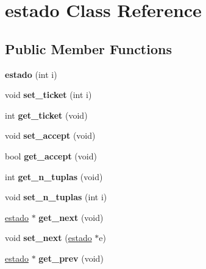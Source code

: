 \hypertarget{classestado}{}\section{estado Class Reference}
\label{classestado}
\subsection*{Public Member Functions}
\begin{DoxyCompactItemize}
\item 
\hypertarget{classestado_a3a5443ccc029390f191d4a1d7294bb8c}{}\label{classestado_a3a5443ccc029390f191d4a1d7294bb8c} 
{\bfseries estado} (int i)
\item 
\hypertarget{classestado_af4b08129baba3c527c2c312b63767b52}{}\label{classestado_af4b08129baba3c527c2c312b63767b52} 
void {\bfseries set\+\_\+ticket} (int i)
\item 
\hypertarget{classestado_a738263997aa35831fd0f5d090688185a}{}\label{classestado_a738263997aa35831fd0f5d090688185a} 
int {\bfseries get\+\_\+ticket} (void)
\item 
\hypertarget{classestado_a97b20af73c289adf4d88bd6ff5f2d875}{}\label{classestado_a97b20af73c289adf4d88bd6ff5f2d875} 
void {\bfseries set\+\_\+accept} (void)
\item 
\hypertarget{classestado_a35f0504728503b9c8d5c76f46d03a1b4}{}\label{classestado_a35f0504728503b9c8d5c76f46d03a1b4} 
bool {\bfseries get\+\_\+accept} (void)
\item 
\hypertarget{classestado_a5c0d978fb042c0501e6d94ec5dfcfa13}{}\label{classestado_a5c0d978fb042c0501e6d94ec5dfcfa13} 
int {\bfseries get\+\_\+n\+\_\+tuplas} (void)
\item 
\hypertarget{classestado_aef1cab9cf3fc54b1e6f94079eb763ffb}{}\label{classestado_aef1cab9cf3fc54b1e6f94079eb763ffb} 
void {\bfseries set\+\_\+n\+\_\+tuplas} (int i)
\item 
\hypertarget{classestado_ad611165c78e55727de7a8fa31c27a90b}{}\label{classestado_ad611165c78e55727de7a8fa31c27a90b} 
\hyperlink{classestado}{estado} $\ast$ {\bfseries get\+\_\+next} (void)
\item 
\hypertarget{classestado_a498f2b55497b9e0b9d0f73fcf5b31fa8}{}\label{classestado_a498f2b55497b9e0b9d0f73fcf5b31fa8} 
void {\bfseries set\+\_\+next} (\hyperlink{classestado}{estado} $\ast$e)
\item 
\hypertarget{classestado_a06ab3fab4fa1f20d936add669f2b8b64}{}\label{classestado_a06ab3fab4fa1f20d936add669f2b8b64} 
\hyperlink{classestado}{estado} $\ast$ {\bfseries get\+\_\+prev} (void)

\end{DoxyCompactItemize}
